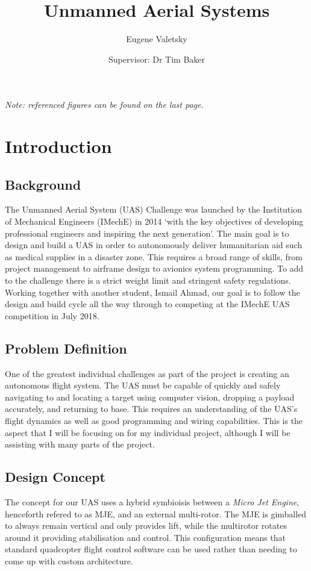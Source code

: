 \documentclass[11pt]{article}
\title{\vspace{-4em}Unmanned Aerial Systems}
\author{Eugene Valetsky\\ \and Supervisor: Dr Tim Baker}
\date{}
\begin{document}
\maketitle

\emph{Note: referenced figures can be found on the last page.}
\section{Introduction}
\subsection{Background}
The Unmanned Aerial System (UAS) Challenge was launched by the Institution of Mechanical Engineers (IMechE) in 2014 `with the key objectives of developing professional engineers and inspiring the next generation'\cite{IMechE_about_uas}. The main goal is to design and build a UAS in order to autonomously deliver humanitarian aid such as medical supplies in a disaster zone. This requires a broad range of skills, from project management to airframe design to avionics system programming. To add to the challenge there is a strict weight limit and stringent safety regulations. Working together with another student, Ismail Ahmad, our goal is to follow the design and build cycle all the way through to competing at the IMechE UAS competition in July 2018.

\subsection{Problem Definition}
One of the greatest individual challenges as part of the project is creating an autonomous flight system. The UAS must be capable of quickly and safely navigating to and locating a target using computer vision, dropping a payload accurately, and returning to base. This requires an understanding of the UAS’s flight dynamics as well as good programming and wiring capabilities. This is the aspect that I will be focusing on for my individual project, although I will be assisting with many parts of the project.

\subsection{Design Concept}
The concept for our UAS uses a hybrid symbioisis between a \emph{Micro Jet Engine}, henceforth refered to as MJE, and an external multi-rotor. The MJE is gimballed to always remain vertical and only provides lift, while the multirotor rotates around it providing stabilisation and control. This configuration means that standard quadcopter flight control software can be used rather than needing to come up with custom architecture.
\end{document}
